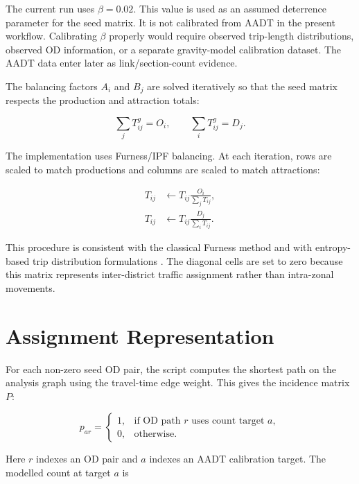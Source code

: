 \documentclass[11pt,a4paper]{article}
\begin{document}
The current run uses $\beta=0.02$. This value is used as an assumed deterrence
parameter for the seed matrix. It is not calibrated from AADT in the present
workflow. Calibrating $\beta$ properly would require observed trip-length
distributions, observed OD information, or a separate gravity-model calibration
dataset. The AADT data enter later as link/section-count evidence.

The balancing factors $A_i$ and $B_j$ are solved iteratively so that the seed
matrix respects the production and attraction totals:

\begin{equation}
\sum_j T^{g}_{ij}=O_i, \qquad \sum_i T^{g}_{ij}=D_j.
\label{eq:constraints}
\end{equation}

The implementation uses Furness/IPF balancing. At each iteration, rows are
scaled to match productions and columns are scaled to match attractions:

\begin{align}
T_{ij} &\leftarrow T_{ij}\frac{O_i}{\sum_j T_{ij}}, \\
T_{ij} &\leftarrow T_{ij}\frac{D_j}{\sum_i T_{ij}}.
\end{align}

This procedure is consistent with the classical Furness method
\cite{furness1965} and with entropy-based trip distribution formulations
\cite{wilson1967,morphet1975}. The diagonal cells are set to zero because this
matrix represents inter-district traffic assignment rather than intra-zonal
movements.

\section{Assignment Representation}

For each non-zero seed OD pair, the script computes the shortest path on the
analysis graph using the travel-time edge weight. This gives the incidence
matrix $P$:

\begin{equation}
p_{ar}=
\begin{cases}
1, & \text{if OD path } r \text{ uses count target } a,\\
0, & \text{otherwise.}
\end{cases}
\label{eq:incidence}
\end{equation}

Here $r$ indexes an OD pair and $a$ indexes an AADT calibration target. The
modelled count at target $a$ is
\end{document}

